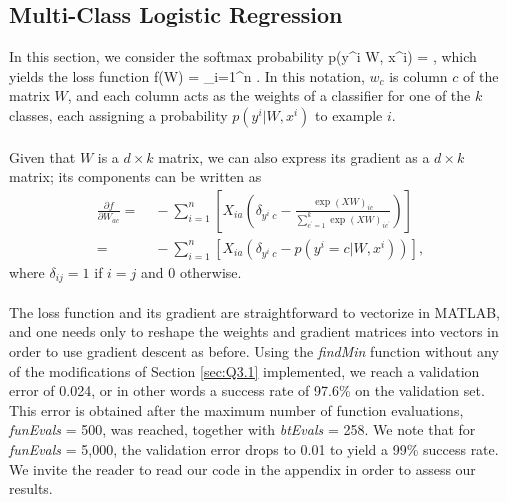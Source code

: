 \subsection{Multi-Class Logistic Regression}

In this section, we consider the softmax probability
\be p(y^i \vert W, x^i) = , \ee
which yields the loss function
\be f(W) = \sum_{i=1}^n \left[ - w_{y^i}^T x^i  + \log \left( \sum_{c^\prime = 1}^k \exp(w_c^T x^i) \right) \right]. \ee
In this notation, $w_c$ is column $c$ of the matrix $W$, and each column acts as the weights of a classifier for one of the $k$ classes, each assigning a probability $p(y^i \vert W, x^i)$ to example $i$. \\
\\
Given that $W$ is a $d \times k$ matrix, we can also express its gradient as a $d \times k$ matrix; its components can be written as
\begin{align} \frac{\partial f}{\partial W_{ac}} =&\; - \sum_{i=1}^n \left[ X_{i a} \left( \delta_{y^i \; c} - \frac{ \exp(XW)_{ic} }{\sum_{c^\prime=1}^k \exp(XW)_{ic^\prime}} \right) \right] \\
=&\;  - \sum_{i=1}^n \left[ X_{i a} \left( \delta_{y^i \; c} - p(y^i = c \vert W, x^i) \right) \right], \end{align}
where $\delta_{ij} = 1$ if $i=j$ and 0 otherwise. \\
\\
The loss function and its gradient are straightforward to vectorize in MATLAB, and one needs only to reshape the weights and gradient matrices into vectors in order to use gradient descent as before. Using the \textit{findMin} function without any of the modifications of Section \ref{sec:Q3.1} implemented, we reach a validation error of 0.024, or in other words a success rate of 97.6\% on the validation set. This error is obtained after the maximum number of function evaluations, \textit{funEvals} = 500, was reached, together with \textit{btEvals} = 258. We note that for \textit{funEvals} = 5,000, the validation error drops to 0.01 to yield a 99\% success rate. We invite the reader to read our code in the appendix in order to assess our results.

